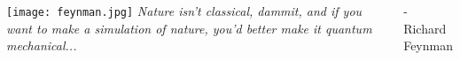 \documentclass{beamer}
\begin{document}
\begin{frame}[standout]
    \begin{columns}
            \centering
            \texttt{[image: feynman.jpg]}
            \emph{Nature isn’t classical, dammit, and if you want to make a simulation of nature, you’d better make it quantum mechanical...}
        \begin{flushright}
            - Richard Feynman
        \end{flushright}
    \end{columns}
\end{frame}
\end{document}
